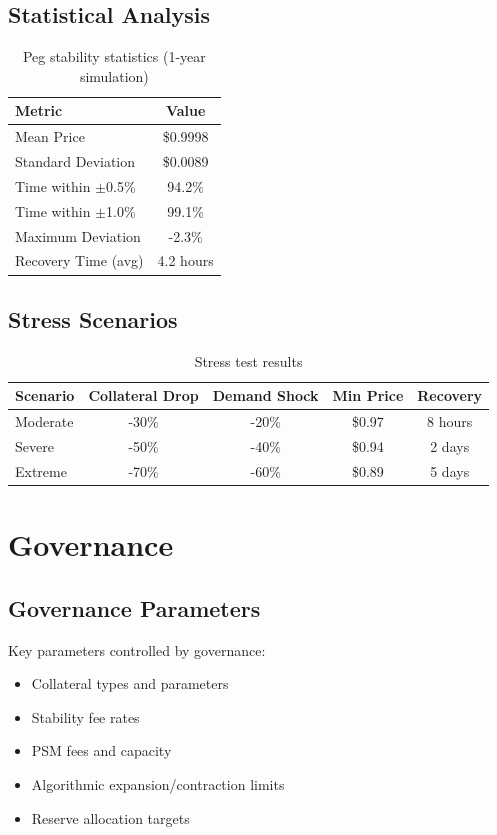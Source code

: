 \documentclass[11pt,a4paper]{article}
\begin{document}
\subsection{Statistical Analysis}

\begin{table}[h]
\centering
\begin{tabular}{@{}lc@{}}
\toprule
Metric & Value \\
\midrule
Mean Price & \$0.9998 \\
Standard Deviation & \$0.0089 \\
Time within $\pm$0.5\% & 94.2\% \\
Time within $\pm$1.0\% & 99.1\% \\
Maximum Deviation & -2.3\% \\
Recovery Time (avg) & 4.2 hours \\
\bottomrule
\end{tabular}
\caption{Peg stability statistics (1-year simulation)}
\label{tab:peg_stats}
\end{table}

\subsection{Stress Scenarios}

\begin{table}[h]
\centering
\begin{tabular}{@{}lcccc@{}}
\toprule
Scenario & Collateral Drop & Demand Shock & Min Price & Recovery \\
\midrule
Moderate & -30\% & -20\% & \$0.97 & 8 hours \\
Severe & -50\% & -40\% & \$0.94 & 2 days \\
Extreme & -70\% & -60\% & \$0.89 & 5 days \\
\bottomrule
\end{tabular}
\caption{Stress test results}
\label{tab:stress}
\end{table}

\section{Governance}

\subsection{Governance Parameters}

Key parameters controlled by governance:
\begin{itemize}
    \item Collateral types and parameters
    \item Stability fee rates
    \item PSM fees and capacity
    \item Algorithmic expansion/contraction limits
    \item Reserve allocation targets
\end{itemize}
\end{document}
